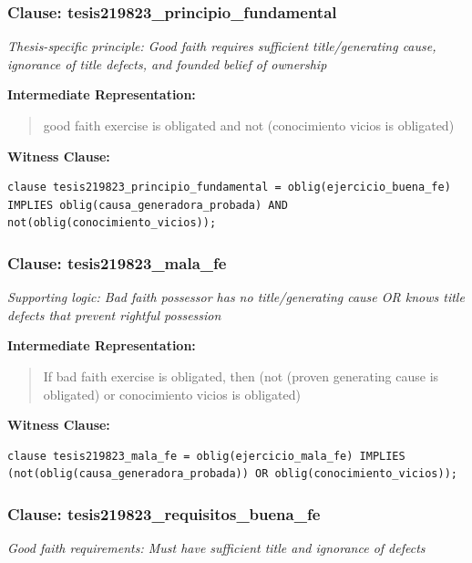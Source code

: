 \documentclass[11pt,a4paper]{article}
\begin{document}
\subsubsection{Clause: tesis219823\_principio\_fundamental}

\textit{Thesis-specific principle: Good faith requires sufficient title/generating cause, ignorance of title defects, and founded belief of ownership}

\textbf{Intermediate Representation:}

\begin{quote}
good faith exercise is obligated and not (conocimiento vicios is obligated)
\end{quote}

\textbf{Witness Clause:}

\begin{lstlisting}[style=witnessstyle, language=Witness]
clause tesis219823_principio_fundamental = oblig(ejercicio_buena_fe) IMPLIES oblig(causa_generadora_probada) AND not(oblig(conocimiento_vicios));
\end{lstlisting}

\subsubsection{Clause: tesis219823\_mala\_fe}

\textit{Supporting logic: Bad faith possessor has no title/generating cause OR knows title defects that prevent rightful possession}

\textbf{Intermediate Representation:}

\begin{quote}
If bad faith exercise is obligated, then (not (proven generating cause is obligated) or conocimiento vicios is obligated)
\end{quote}

\textbf{Witness Clause:}

\begin{lstlisting}[style=witnessstyle, language=Witness]
clause tesis219823_mala_fe = oblig(ejercicio_mala_fe) IMPLIES (not(oblig(causa_generadora_probada)) OR oblig(conocimiento_vicios));
\end{lstlisting}

\subsubsection{Clause: tesis219823\_requisitos\_buena\_fe}

\textit{Good faith requirements: Must have sufficient title and ignorance of defects}
\end{document}
